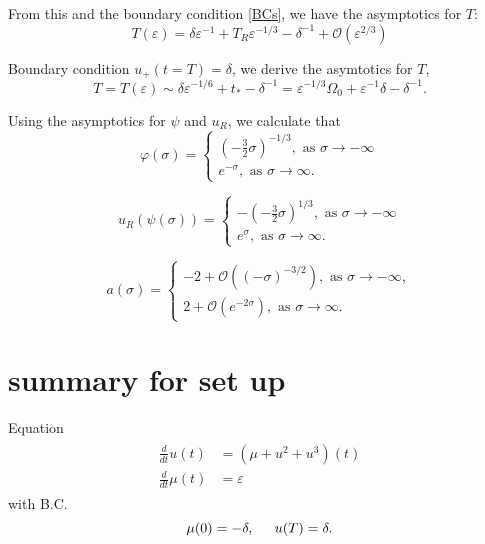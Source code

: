 \documentclass[letterpaper,11pt]{article}
\newcommand{\rmO}{\mathcal{O}}
\newcommand{\eps}{\varepsilon}
\numberwithin{equation}{section}
\theoremstyle{plain}
\begin{document}
From this and the boundary condition \eqref{BCs}, we have the asymptotics for $T$:
\begin{equation}
T (\eps)= \delta \eps^{-1} + T_R\eps^{-1/3} - \delta^{-1} + \rmO(\eps^{2/3})
\end{equation}


Boundary condition $u_+(t=T)=\delta$, we derive the asymtotics for $T$,
\[
T = T(\eps) \sim \delta\eps^{-1/6} + t_* -\delta^{-1} = \eps^{-1/3}\Omega_0 +\eps^{-1}\delta -\delta^{-1}.
\]


Using the asymptotics for $\psi$ and $u_R$, we calculate that
\begin{equation}
\varphi(\sigma) =\begin{cases}
 (-\frac{3}{2}\sigma)^{-1/3}, \text{ as }\sigma \to -\infty\\
e^{-\sigma} , \text{ as }\sigma \to \infty.
\end{cases}
\end{equation}

\begin{equation}
u_R(\psi(\sigma)) =\begin{cases}
 -(-\frac{3}{2}\sigma)^{1/3}, \text{ as }\sigma \to -\infty\\
e^{\sigma} , \text{ as }\sigma \to \infty.
\end{cases}
\end{equation}

\begin{equation}
a(\sigma) =\begin{cases}
-2+ \rmO((-\sigma)^{-3/2}), \text{ as }\sigma \to -\infty,\\
2+ \rmO(e^{-2\sigma}), \text{ as }\sigma \to \infty.
\end{cases}
\end{equation}



\pagebreak

\section{summary for set up}
Equation
\begin{align}
\begin{split}
\frac{d}{dt}u(t) &= (\mu+u^2+u^3)(t) \\
\frac{d}{dt}\mu (t)&=  \eps 
\end{split}
\end{align}
with B.C.
\begin{equation}
\mu(0) = -\delta, \hspace{0.2in} u(T) = \delta.
\end{equation}
\end{document}
